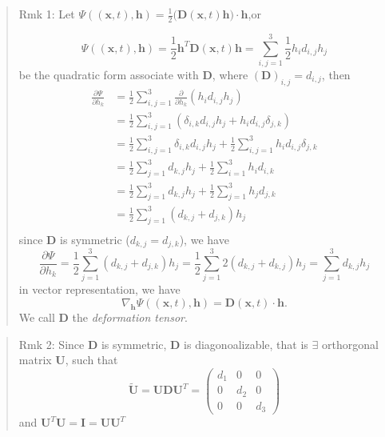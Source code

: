 \begin{quote}
	Rmk 1:
Let $\displaystyle \Psi((\textbf{x},t),\textbf{h})=\frac{1}{2}\big(\textbf{D}(\textbf{x},t)\textbf{h}\big)\cdot\textbf{h}$,or

\begin{equation}
\Psi((\textbf{x},t),\textbf{h}) = \frac{1}{2}\textbf{h}^{T}\textbf{D}(\textbf{x},t)\textbf{h}
= \sum_{i,j=1}^{3}\frac{1}{2}h_{i}d_{i,j}h_{j}
\end{equation}
be the quadratic form associate with $\textbf{D}$, where $(\textbf{D})_{i,j} = d_{i,j}$, then
\begin{equation}
\begin{aligned}
\frac{\partial \Psi}{\partial h_{k}}
&= \frac{1}{2}\sum_{i,j=1}^{3}\frac{\partial}{\partial h_{k}}\left(h_{i}d_{i,j}h_{j}\right)\\
&= \frac{1}{2}\sum_{i,j=1}^{3}\left(\delta_{i,k}d_{i,j}h_{j} + h_{i}d_{i,j}\delta_{j,k}\right)\\
&= \frac{1}{2}\sum_{i,j=1}^{3}\delta_{i,k}d_{i,j}h_{j}
+ \frac{1}{2}\sum_{i,j=1}^{3} h_{i}d_{i,j}\delta_{j,k}\\
&= \frac{1}{2}\sum_{j=1}^{3}d_{k,j}h_{j}
+ \frac{1}{2}\sum_{i=1}^{3} h_{i}d_{i,k}\\
&= \frac{1}{2}\sum_{j=1}^{3}d_{k,j}h_{j}
+ \frac{1}{2}\sum_{j=1}^{3} h_{j}d_{j,k}\\
&= \frac{1}{2}\sum_{j=1}^{3}(d_{k,j} +  d_{j,k})h_{j}\\
\end{aligned}
\end{equation}
since $\textbf{D}$ is symmetric ($d_{k,j}=d_{j,k}$), we have
\begin{equation}
\frac{\partial \Psi}{\partial h_{k}}
= \frac{1}{2}\sum_{j=1}^{3}(d_{k,j} + d_{j,k})h_{j}
= \frac{1}{2}\sum_{j=1}^{3}2(d_{k,j} + d_{k,j})h_{j}
= \sum_{j=1}^{3}d_{k,j}h_{j}
\end{equation}
in vector representation, we have
\begin{equation}
\nabla_{\textbf{h}} \Psi((\textbf{x},t), \textbf{h}) = \textbf{D}(\textbf{x},t)\cdot \textbf{h}.
\end{equation}
We call $\textbf{D}$ the \textit{deformation tensor}.
\end{quote}

\begin{quote}
	Rmk 2:
Since $\textbf{D}$ is symmetric, $\textbf{D}$ is diagonoalizable, that is $\exists$ orthorgonal matrix $\textbf{U}$, such that
\begin{equation}
\widetilde{\textbf{U}} = \textbf{U}\textbf{D}\textbf{U}^{T}
= \begin{pmatrix}
d_1 & 0 & 0\\
0 & d_2 & 0\\
0 & 0 & d_3
\end{pmatrix}
\end{equation}
and $\textbf{U}^{T}\textbf{U} = \textbf{I} = \textbf{U}\textbf{U}^{T}$
\end{quote}

